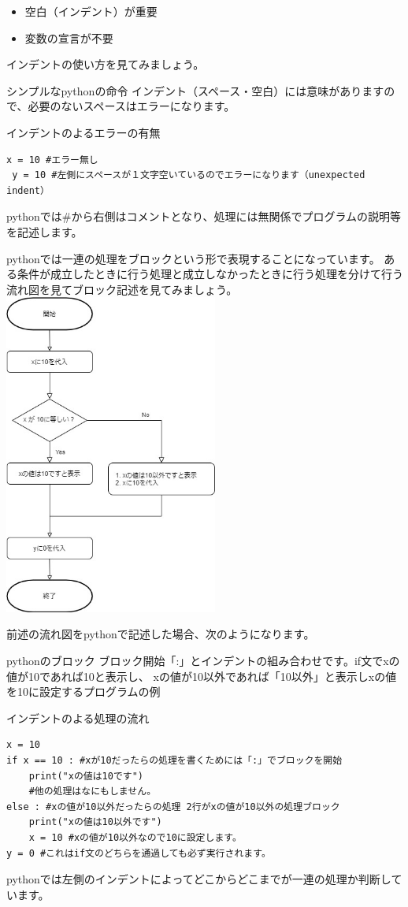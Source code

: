 \documentclass[11pt,a4paper,dvipdfmx,titlepage]{jsreport}
\begin{document}
\begin{itemize}
\item 空白（インデント）が重要
\item 変数の宣言が不要
\end{itemize}
インデントの使い方を見てみましょう。
\begin{pabox}{シンプルなpythonの命令}
インデント（スペース・空白）には意味がありますので、必要のないスペースはエラーになります。
\begin{legbox}{インデントのよるエラーの有無}
\begin{verbatim}
x = 10 #エラー無し
 y = 10 #左側にスペースが１文字空いているのでエラーになります（unexpected indent）
\end{verbatim}
\end{legbox}
pythonでは\#から右側はコメントとなり、処理には無関係でプログラムの説明等を記述します。
\end{pabox}

pythonでは一連の処理をブロックという形で表現することになっています。
ある条件が成立したときに行う処理と成立しなかったときに行う処理を分けて行う流れ図を見てブロック記述を見てみましょう。\\

\includegraphics[width=7cm]{images/ifflow.jpg}

\newpage
前述の流れ図をpythonで記述した場合、次のようになります。 
\begin{pabox}{pythonのブロック}
ブロック開始「:」とインデントの組み合わせです。if文でxの値が10であれば10と表示し、
xの値が10以外であれば「10以外」と表示しxの値を10に設定するプログラムの例
\begin{legbox}{インデントのよる処理の流れ}
\begin{verbatim}
x = 10
if x == 10 : #xが10だったらの処理を書くためには「:」でブロックを開始
    print("xの値は10です")
    #他の処理はなにもしません。
else : #xの値が10以外だったらの処理 2行がxの値が10以外の処理ブロック
    print("xの値は10以外です")
    x = 10 #xの値が10以外なので10に設定します。
y = 0 #これはif文のどちらを通過しても必ず実行されます。
\end{verbatim}
\end{legbox}
pythonでは左側のインデントによってどこからどこまでが一連の処理か判断しています。
\end{pabox}
\end{document}
